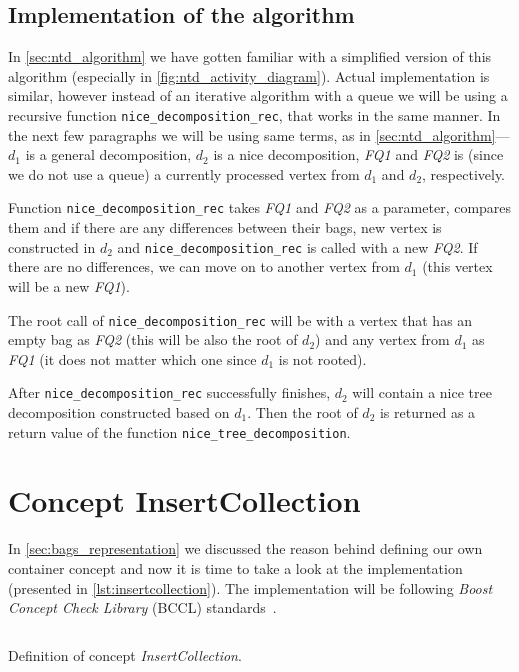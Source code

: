 \documentclass[thesis=B,english]{FITthesis}[2019/03/21]
\begin{document}
\subsection{Implementation of the algorithm}
In \autoref{sec:ntd_algorithm} we have gotten familiar with a simplified version of this algorithm (especially in \autoref{fig:ntd_activity_diagram}). Actual implementation is similar, however instead of an iterative algorithm with a queue we will be using a recursive function \texttt{nice\_decomposition\_rec}, that works in the same manner. In the next few paragraphs we will be using same terms, as in \autoref{sec:ntd_algorithm}---$d_1$ is a general decomposition, $d_2$ is a nice decomposition, \emph{FQ1} and \emph{FQ2} is (since we do not use a queue) a currently processed vertex from $d_1$ and $d_2$, respectively.

Function \texttt{nice\_decomposition\_rec} takes \emph{FQ1} and \emph{FQ2} as a parameter, compares them and if there are any differences between their bags, new vertex is constructed in $d_2$ and \texttt{nice\_decomposition\_rec} is called with a new \emph{FQ2}. If there are no differences, we can move on to another vertex from $d_1$ (this vertex will be a new \emph{FQ1}).

The root call of \texttt{nice\_decomposition\_rec} will be with a vertex that has an empty bag as \emph{FQ2} (this will be also the root of $d_2$) and any vertex from $d_1$ as \emph{FQ1} (it does not matter which one since $d_1$ is not rooted).

After \texttt{nice\_decomposition\_rec} successfully finishes, $d_2$ will contain a nice tree decomposition constructed based on $d_1$. Then the root of $d_2$ is returned as a return value of the function \texttt{nice\_tree\_decomposition}.

\section{Concept InsertCollection}\label{sec:insertcollection}
In \autoref{sec:bags_representation} we discussed the reason behind defining our own container concept and now it is time to take a look at the implementation (presented in \autoref{lst:insertcollection}). The implementation will be following \emph{Boost Concept Check Library} (BCCL) standards~\cite{bccl_class}.

\begin{listing}[H]
	\inputminted[tabsize=2,breaklines,bgcolor=codebg]{c++}{snippets/insertcollection.m}
	\caption[Definition of concept \emph{InsertCollection}]{Definition of concept \emph{InsertCollection}.}
	\label{lst:insertcollection}
\end{listing}
\end{document}
